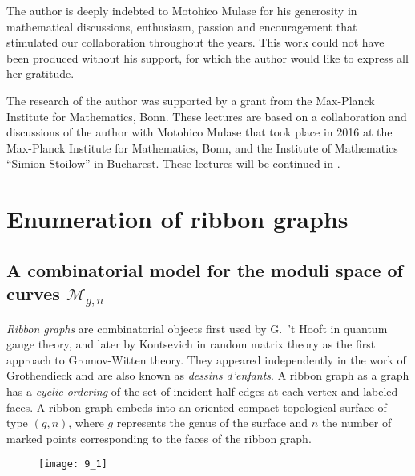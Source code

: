\documentclass[oneside, 11pt]{amsart}
\theoremstyle{definition}
\numberwithin{equation}{subsection}
\newcommand{\cM}{{\mathcal{M}}}
\begin{document}
The author is deeply indebted to Motohico Mulase for his generosity in mathematical discussions, enthusiasm, passion and encouragement that stimulated our collaboration throughout the years. This work could not have been produced without his support, for which the author would like to express all her gratitude.

The research of the author was supported by a grant from the Max-Planck Institute for Mathematics, Bonn. These lectures are based on a
collaboration  and discussions of the author with Motohico Mulase that took place in 2016 at the  Max-Planck Institute for Mathematics, Bonn,   and the Institute of Mathematics ``Simion Stoilow'' in
Bucharest. These lectures will be continued in \cite{OD21, OD22}.



\section{Enumeration of ribbon graphs}\label{section 2} 

\subsection{A combinatorial model for the moduli space of curves $\cM_{g,n}$}

\allowdisplaybreaks
\textit{Ribbon graphs}
are combinatorial objects  first used by G.~'t Hooft \cite{tH}  in quantum gauge theory, and later 
by Kontsevich
\cite{K1992}
in random matrix theory as the first approach to Gromov-Witten theory. They appeared independently in the work of Grothendieck \cite{Gro}
and are also known as \textit{dessins d'enfants}. A ribbon graph as a graph has a \textit{cyclic ordering} of the set of incident half-edges at each vertex and labeled faces. A ribbon graph embeds into an oriented
compact topological surface of type $(g,n)$, where $g$ represents the genus of the 
surface and $n$ the number of marked points
corresponding to the faces of the ribbon graph.
\begin{figure}[h]
\texttt{[image: 9\_1]}
\caption{}
\end{figure}
\end{document}
